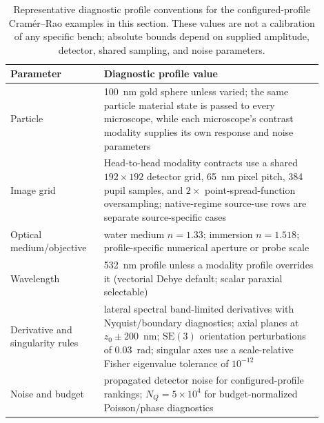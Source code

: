 
\begin{table}[H]
\centering
\small
\begin{tabular}{p{0.26\linewidth}p{0.64\linewidth}}
\toprule
Parameter & Diagnostic profile value \\
\midrule
Particle & 100~nm gold sphere unless varied; the same particle material state is passed to every microscope, while each microscope's contrast modality supplies its own response and noise parameters \\
Image grid & Head-to-head modality contracts use a shared \(192\times192\) detector grid, 65~nm pixel pitch, 384 pupil samples, and \(2\times\) point-spread-function oversampling; native-regime source-use rows are separate source-specific cases \\
Optical medium/objective & water medium $n=1.33$; immersion $n=1.518$; profile-specific numerical aperture or probe scale \\
Wavelength & 532~nm profile unless a modality profile overrides it (vectorial Debye default; scalar paraxial selectable) \\
Derivative and singularity rules & lateral spectral band-limited derivatives with Nyquist/boundary diagnostics; axial planes at $z_0\pm200$~nm; $\mathrm{SE}(3)$ orientation perturbations of 0.03~rad; singular axes use a scale-relative Fisher eigenvalue tolerance of $10^{-12}$ \\
Noise and budget & propagated detector noise for configured-profile rankings; $N_Q=5\times10^4$ for budget-normalized Poisson/phase diagnostics \\
\bottomrule
\end{tabular}
\caption{Representative diagnostic profile conventions for the configured-profile Cram\'{e}r--Rao examples in this section. These values are not a calibration of any specific bench; absolute bounds depend on supplied amplitude, detector, shared sampling, and noise parameters.}
\label{tab:default-profile}
\end{table}

